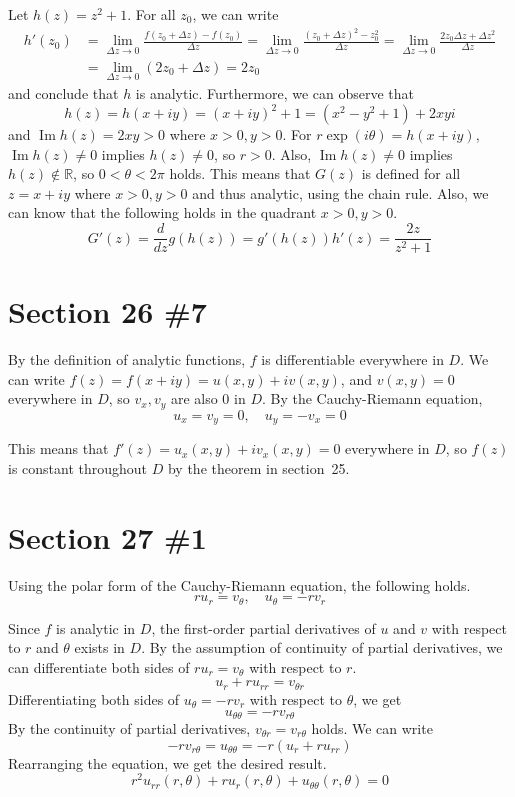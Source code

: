 \documentclass{scrartcl}
\begin{document}
Let \(h(z) = z^2 + 1\).
For all \(z_0\), we can write
\begin{align*}
  h'(z_0) &= \lim_{\Delta z \to 0} \frac{f(z_0 + \Delta z) - f(z_0)}{\Delta z} = \lim_{\Delta z \to 0} \frac{(z_0 + \Delta z)^2 - z_0^2}{\Delta z} = \lim_{\Delta z \to 0} \frac{2z_0\Delta z + \Delta z^2}{\Delta z} \\
          &= \lim_{\Delta z \to 0} (2z_0 + \Delta z) = 2z_0
\end{align*}
and conclude that \(h\) is analytic.
Furthermore, we can observe that
\[
  h(z) = h(x + iy) = (x + iy)^2 + 1 = (x^2 - y^2 + 1) + 2xyi
\]
and \(\operatorname{Im} h(z) = 2xy > 0\) where \(x > 0, y > 0\).
For \(r\exp(i\theta) = h(x + iy)\), \(\operatorname{Im} h(z) \not = 0\) implies \(h(z) \not = 0\), so \(r > 0\).
Also, \(\operatorname{Im} h(z) \not = 0\) implies \(h(z) \not \in \mathbb{R}\), so \(0 < \theta < 2\pi\) holds.
This means that \(G(z)\) is defined for all \(z = x + iy\) where \(x > 0, y > 0\) and thus analytic, using the chain rule.
Also, we can know that the following holds in the quadrant \(x > 0, y > 0\).
\[
  G'(z) = \frac{d}{dz} g(h(z)) = g'(h(z)) h'(z) = \frac{2z}{z^2 + 1}
\]

\section{Section 26 \#7}
By the definition of analytic functions, \(f\) is differentiable everywhere in \(D\).
We can write \(f(z) = f(x + iy) = u(x, y) + iv(x, y)\), and \(v(x, y) = 0\) everywhere in \(D\), so \(v_x, v_y\) are also 0 in \(D\).
By the Cauchy-Riemann equation,
\[
  u_x = v_y = 0, \quad u_y = -v_x = 0
\]

This means that \(f'(z) = u_x(x, y) + iv_x(x, y) = 0\) everywhere in \(D\), so \(f(z)\) is constant throughout \(D\) by the theorem in section~25.

\section{Section 27 \#1}
Using the polar form of the Cauchy-Riemann equation, the following holds.
\[
  ru_r = v_\theta,\quad u_\theta = -rv_r
\]

Since \(f\) is analytic in \(D\), the first-order partial derivatives of \(u\) and \(v\) with respect to \(r\) and \(\theta\) exists in \(D\).
By the assumption of continuity of partial derivatives, we can differentiate both sides of \(ru_r = v_\theta\) with respect to \(r\).
\[
  u_r + ru_{rr} = v_{\theta r}
\]
Differentiating both sides of \(u_\theta = -rv_r\) with respect to \(\theta\), we get
\[
  u_{\theta\theta} = -rv_{r\theta}
\]
By the continuity of partial derivatives, \(v_{\theta r} = v_{r\theta}\) holds.
We can write
\[
  -rv_{r\theta} = u_{\theta\theta} = -r(u_r + ru_{rr})
\]
Rearranging the equation, we get the desired result.
\[
  r^2 u_{rr}(r, \theta) + ru_r(r, \theta) + u_{\theta\theta}(r, \theta) = 0
\]
\end{document}
